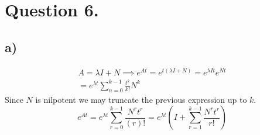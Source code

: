 \documentclass[
	12pt,
	]{article}
\theoremstyle{definition}
\theoremstyle{definition}
\theoremstyle{definition}
\theoremstyle{definition}
\theoremstyle{definition}
\theoremstyle{example}
\theoremstyle{note}
\theoremstyle{remark}
\theoremstyle{example}
\begin{document}
 			 \section*{Question 6.}
 			 	\subsection*{a) }
 			 		\begin{gather*}
 			 			A = \lambda I +N  \implies e^{At} = e^{t(\lambda I + N)} = e^{\lambda I t} e^{Nt} \\
 			 			= e^{\lambda t} \sum_{n=0}^{k-1} \frac{t^{k}}{k!}N^{k}
 			 		\end{gather*}
 			 		Since $N$ is nilpotent we may truncate the previous expression up to $k$.
 			 		$$ e^{At} = e^{\lambda t} \sum_{r=0}^{k-1} \frac{N^{r}t^{r}}{(r)!} = e^{\lambda t}\left(I + \sum_{r=1}^{k-1}\frac{N^{r}t^{r}}{r!}\right)$$
\end{document}
